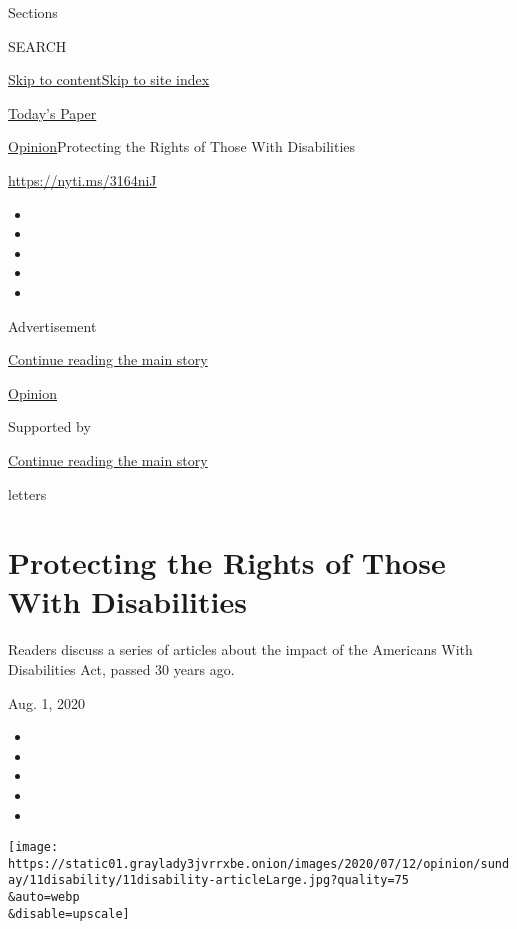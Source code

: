 Sections

SEARCH

\protect\hyperlink{site-content}{Skip to
content}\protect\hyperlink{site-index}{Skip to site index}

\href{https://myaccount.nytimes3xbfgragh.onion/auth/login?response_type=cookie\&client_id=vi}{}

\href{https://www.nytimes3xbfgragh.onion/section/todayspaper}{Today's
Paper}

\href{/section/opinion}{Opinion}\textbar{}Protecting the Rights of Those
With Disabilities

\url{https://nyti.ms/3164niJ}

\begin{itemize}
\item
\item
\item
\item
\item
\end{itemize}

Advertisement

\protect\hyperlink{after-top}{Continue reading the main story}

\href{/section/opinion}{Opinion}

Supported by

\protect\hyperlink{after-sponsor}{Continue reading the main story}

letters

\hypertarget{protecting-the-rights-of-those-with-disabilities}{%
\section{Protecting the Rights of Those With
Disabilities}\label{protecting-the-rights-of-those-with-disabilities}}

Readers discuss a series of articles about the impact of the Americans
With Disabilities Act, passed 30 years ago.

Aug. 1, 2020

\begin{itemize}
\item
\item
\item
\item
\item
\end{itemize}

\texttt{[image: https://static01.graylady3jvrrxbe.onion/images/2020/07/12/opinion/sunday/11disability/11disability-articleLarge.jpg?quality=75\\\&auto=webp\\\&disable=upscale]}


